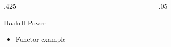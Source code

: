 \documentclass[final,hyperref={pdfpagelabels=false}]{beamer}
\newcommand\sepsize{.05\textwidth}
\newcommand\colsize{.425\textwidth}
\begin{document}
\begin{frame}[t]
\begin{columns}[t]
\begin{column}{\colsize}
\begin{block}{Haskell Power}
	\begin{itemize}
		\item Functor example
	\end{itemize}
\end{block}


\end{column} %

\begin{column}{\sepsize}\end{column} %

\end{columns} %

\end{frame} %
\end{document}
